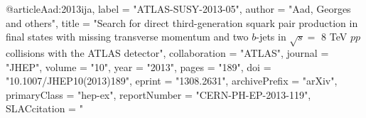 @article{Aad:2013ija,
      label          = "ATLAS-SUSY-2013-05",
      author         = "Aad, Georges and others",
      title          = "{Search for direct third-generation squark pair
                        production in final states with missing transverse
                        momentum and two $b$-jets in $\sqrt{s} =$ 8 TeV $pp$
                        collisions with the ATLAS detector}",
      collaboration  = "ATLAS",
      journal        = "JHEP",
      volume         = "10",
      year           = "2013",
      pages          = "189",
      doi            = "10.1007/JHEP10(2013)189",
      eprint         = "1308.2631",
      archivePrefix  = "arXiv",
      primaryClass   = "hep-ex",
      reportNumber   = "CERN-PH-EP-2013-119",
      SLACcitation   = "%
}

